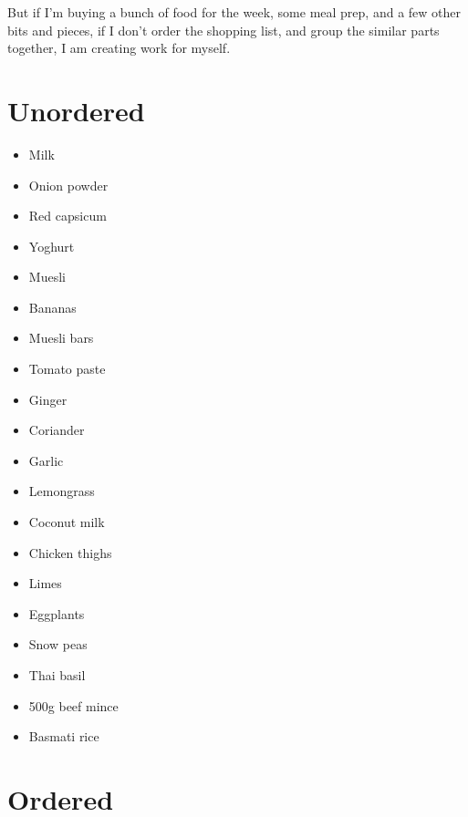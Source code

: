 \documentclass[
  letterpaper,
  justified,
  a4paper]{tufte-book}
\providecommand{\tightlist}{%
  \setlength{\itemsep}{0pt}\setlength{\parskip}{0pt}}
\providecommand{\tightlist}{%
  \setlength{\itemsep}{0pt}\setlength{\parskip}{0pt}}
\begin{document}
But if I'm buying a bunch of food for the week, some meal prep, and a
few other bits and pieces, if I don't order the shopping list, and group
the similar parts together, I am creating work for myself.

\section{Unordered}

\begin{itemize}
\tightlist
\item
  Milk
\item
  Onion powder
\item
  Red capsicum
\item
  Yoghurt
\item
  Muesli
\item
  Bananas
\item
  Muesli bars
\item
  Tomato paste
\item
  Ginger
\item
  Coriander
\item
  Garlic
\item
  Lemongrass
\item
  Coconut milk
\item
  Chicken thighs
\item
  Limes
\item
  Eggplants
\item
  Snow peas
\item
  Thai basil
\item
  500g beef mince
\item
  Basmati rice
\end{itemize}

\section{Ordered}
\end{document}
